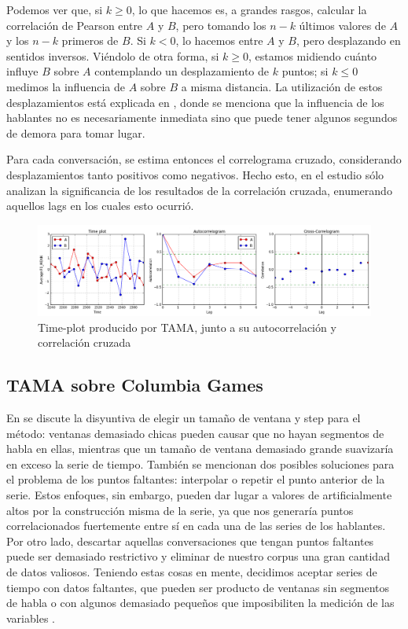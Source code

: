 Podemos ver que, si $k \geq 0$, lo que hacemos es, a grandes rasgos, calcular la correlación de Pearson entre $A$ y $B$, pero tomando los $n-k$ últimos valores de $A$ y los $n-k$ primeros de $B$. Si $k < 0$, lo hacemos entre $A$ y $B$, pero desplazando en sentidos inversos. Viéndolo de otra forma, si $k \geq 0$, estamos midiendo cuánto influye $B$ sobre $A$ contemplando un desplazamiento de $k$ puntos; si $k \leq 0$ medimos la influencia de $A$ sobre $B$ a misma distancia. La utilización de estos desplazamientos está explicada en \cite{gravano2015backward}, donde se menciona que la influencia de los hablantes no es necesariamente inmediata sino que puede tener algunos segundos de demora para tomar lugar. 

Para cada conversación, se estima entonces el correlograma cruzado, considerando desplazamientos tanto positivos como negativos. Hecho esto, en el estudio \cite{KOU2008.2} sólo analizan la significancia de los resultados de la correlación cruzada, enumerando aquellos lags en los cuales esto ocurrió.

\begin{figure}[b]
\centering
\includegraphics[width=\textwidth]{images/time_plot_with_cross_correlation.png}
\caption{Time-plot producido por TAMA, junto a su autocorrelación y correlación cruzada}
\end{figure}


\subsection{TAMA sobre Columbia Games}
\label{sec:tama_modifications}

En \cite{KOU2008.2} se discute la disyuntiva de elegir un tamaño de ventana y step para el método: ventanas demasiado chicas pueden causar que no hayan segmentos de habla en ellas, mientras que un tamaño de ventana demasiado grande suavizaría en exceso la serie de tiempo. También se mencionan dos posibles soluciones para el problema de los puntos faltantes: interpolar \cite{DEL2013} o repetir el punto anterior de la serie. Estos enfoques, sin embargo, pueden dar lugar a valores de \entrainment artificialmente altos  por la construcción misma de la serie, ya que nos generaría puntos correlacionados fuertemente entre sí en cada una de las series de los hablantes. Por otro lado, descartar aquellas conversaciones que tengan puntos faltantes puede ser demasiado restrictivo y eliminar de nuestro corpus una gran cantidad de datos valiosos. Teniendo estas cosas en mente, decidimos aceptar series de tiempo con datos faltantes, que pueden ser producto de ventanas sin segmentos de habla o con algunos demasiado pequeños que imposibiliten la medición de las variables \ap.

